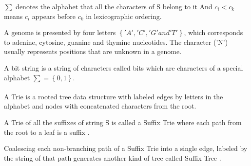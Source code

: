 \documentclass[11pt,a4paper]{report}
\begin{document}
$ \sum $  denotes the alphabet that all the characters of S belong to it And  $ c_{i} < c_{k}$ means $c_{i}$ appears before $c_{k}$ in lexicographic ordering.

A genome is presented by four letters $\left\{ 'A', 'C', 'G' and 'T'\right\}$, which corresponds to adenine, cytosine, guanine and thymine nucleotides. The character ('N') usually represents positions that are unknown in a genome.


A bit string is a string of characters called bits which are characters of a special alphabet  $ \sum = \left\{ 0, 1 \right\}$.
\\\\


A Trie is a rooted tree data structure with labeled edges by letters in the alphabet and nodes with concatenated characters from the root\cite{trie}. 

A Trie of all the suffixes of string S is called a Suffix Trie where each path from the root to a leaf is a suffix \cite{gusfield1997algorithms}.

Coalescing each non-branching path of a Suffix Trie into a single edge, labeled by the string of that path generates another kind of tree called Suffix Tree \cite{gusfield1997algorithms}.\\
\end{document}
